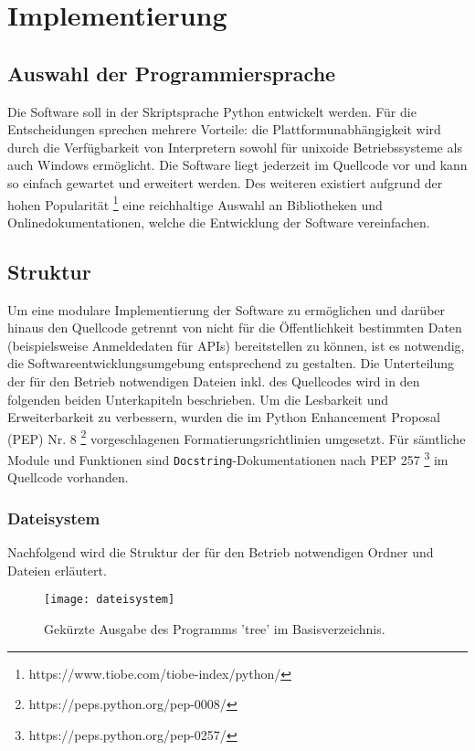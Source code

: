 \chapter{Implementierung}
\label{cha:implementierung}

\section{Auswahl der Programmiersprache}

Die Software soll in der Skriptsprache Python entwickelt werden. Für die Entscheidungen sprechen mehrere Vorteile: die Plattformunabhängigkeit wird durch die Verfügbarkeit von Interpretern sowohl für unixoide Betriebssysteme als auch Windows ermöglicht. Die Software liegt jederzeit im Quellcode vor und kann so einfach gewartet und erweitert werden. Des weiteren existiert aufgrund der hohen Popularität \footnote{https://www.tiobe.com/tiobe-index/python/} eine reichhaltige Auswahl an Bibliotheken und Onlinedokumentationen, welche die Entwicklung der Software vereinfachen. 

\section{Struktur}

Um eine modulare Implementierung der Software zu ermöglichen und darüber hinaus den Quellcode getrennt von nicht für die Öffentlichkeit bestimmten Daten (beispielsweise Anmeldedaten für APIs) bereitstellen zu können, ist es notwendig, die Softwareentwicklungsumgebung entsprechend zu gestalten. Die Unterteilung der für den Betrieb notwendigen Dateien inkl. des Quellcodes wird in den folgenden beiden Unterkapiteln beschrieben. Um die Lesbarkeit und Erweiterbarkeit zu verbessern, wurden die im Python Enhancement Proposal (PEP) Nr. 8 \footnote{https://peps.python.org/pep-0008/} vorgeschlagenen Formatierungsrichtlinien umgesetzt. Für sämtliche Module und Funktionen sind \lstinline{Docstring}-Dokumentationen nach PEP 257 \footnote{https://peps.python.org/pep-0257/} im Quellcode vorhanden.

\subsection{Dateisystem}

Nachfolgend wird die Struktur der für den Betrieb notwendigen Ordner und Dateien erläutert.

\begin{figure}[h!]
\centering
\texttt{[image: dateisystem]}
\caption{Gekürzte Ausgabe des Programms 'tree' im Basisverzeichnis.}
\label{fig:dateisystem}
\end{figure}

